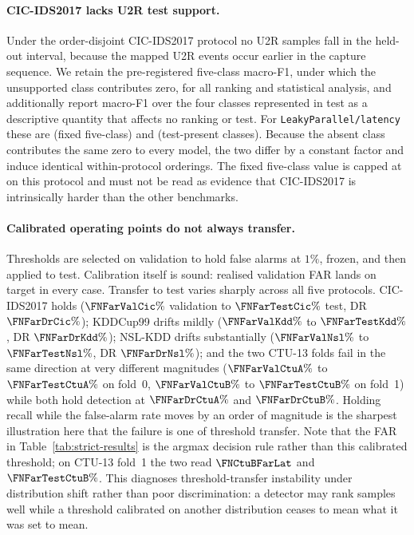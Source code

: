 \paragraph{CIC-IDS2017 lacks U2R test support.}
Under the order-disjoint CIC-IDS2017 protocol no U2R samples fall in the
held-out interval, because the mapped U2R events occur earlier in the capture
sequence. We retain the pre-registered five-class macro-F1, under which the
unsupported class contributes zero, for all ranking and statistical analysis,
and additionally report macro-F1 over the four classes represented in test as a
descriptive quantity that affects no ranking or test. For
\texttt{LeakyParallel/latency} these are \FNCicFixedLat{} (fixed five-class) and
\FNCicPresentLat{} (test-present classes). Because the absent class contributes
the same zero to every model, the two differ by a constant factor and induce
identical within-protocol orderings. The fixed five-class value is capped at
\FNCicCeiling{} on this protocol and must not be read as evidence that
CIC-IDS2017 is intrinsically harder than the other benchmarks.

\paragraph{Calibrated operating points do not always transfer.}
Thresholds are selected on validation to hold false alarms at $1\%$, frozen, and
then applied to test. Calibration itself is sound: realised validation FAR
lands on target in every case. Transfer to test varies sharply across all five
protocols. CIC-IDS2017 holds ($\FNFarValCic\%$ validation to $\FNFarTestCic\%$
test, DR $\FNFarDrCic\%$); KDDCup99 drifts mildly ($\FNFarValKdd\%$ to
$\FNFarTestKdd\%$, DR $\FNFarDrKdd\%$); NSL-KDD drifts substantially
($\FNFarValNsl\%$ to $\FNFarTestNsl\%$, DR $\FNFarDrNsl\%$); and the two CTU-13
folds fail in the same direction at very different magnitudes
($\FNFarValCtuA\%$ to $\FNFarTestCtuA\%$ on fold~0, $\FNFarValCtuB\%$ to
$\FNFarTestCtuB\%$ on fold~1) while both hold detection at $\FNFarDrCtuA\%$ and
$\FNFarDrCtuB\%$. Holding recall while the false-alarm rate moves by an order of
magnitude is the sharpest illustration here that the failure is one of threshold
transfer. Note that the FAR in Table~\ref{tab:strict-results} is the argmax
decision rule rather than this calibrated threshold; on CTU-13 fold~1 the two
read $\FNCtuBFarLat$ and $\FNFarTestCtuB\%$. This diagnoses
threshold-transfer instability under distribution shift rather than poor
discrimination: a detector may rank samples well while a threshold calibrated on
another distribution ceases to mean what it was set to mean.


